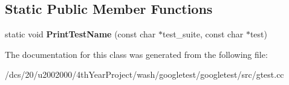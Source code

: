 \subsection*{Static Public Member Functions}
\begin{DoxyCompactItemize}
\item 
\mbox{\label{classtesting_1_1internal_1_1BriefUnitTestResultPrinter_a813e9362f92046cbd7b0f30fcdd30ea8}} 
static void {\bfseries Print\+Test\+Name} (const char $\ast$test\+\_\+suite, const char $\ast$test)
\end{DoxyCompactItemize}


The documentation for this class was generated from the following file\+:\begin{DoxyCompactItemize}
\item 
/dcs/20/u2002000/4th\+Year\+Project/wash/googletest/googletest/src/gtest.\+cc\end{DoxyCompactItemize}
